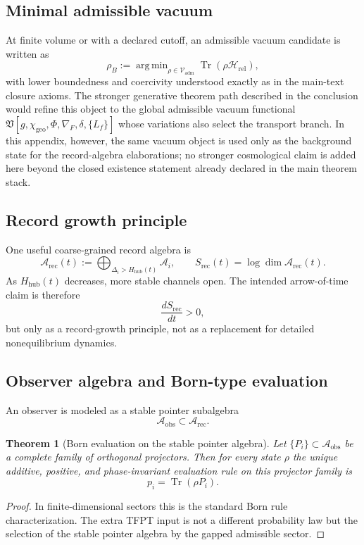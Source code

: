 \documentclass[11pt,a4paper]{article}
\newtheorem{theorem}{Theorem}[section]
\theoremstyle{definition}
\theoremstyle{remark}
\DeclareMathOperator{\tr}{Tr}
\DeclareMathOperator{\argmin}{arg\,min}
\newcommand{\Arec}{\mathcal A_{\mathrm{rec}}}
\newcommand{\Aobs}{\mathcal A_{\mathrm{obs}}}
\newcommand{\Vadm}{\mathcal V_{\mathrm{adm}}}
\newcommand{\Hrel}{\mathcal H_{\mathrm{rel}}}
\newcommand{\Hhub}{H_{\mathrm{hub}}}
\newcommand{\chigeo}{\chi_{\mathrm{geo}}}
\begin{document}
\subsection{Minimal admissible vacuum}

At finite volume or with a declared cutoff, an admissible vacuum candidate is written as
\[
\rho_B
:=
\argmin_{\rho\in\Vadm}\tr(\rho\Hrel),
\]
with lower boundedness and coercivity understood exactly as in the main-text closure axioms. The stronger generative theorem path described in the conclusion would refine this object to the global admissible vacuum functional $\mathfrak V[g,\chigeo,\Phi,\nabla_F,\delta,\{L_f\}]$ whose variations also select the transport branch. In this appendix, however, the same vacuum object is used only as the background state for the record-algebra elaborations; no stronger cosmological claim is added here beyond the closed existence statement already declared in the main theorem stack.

\subsection{Record growth principle}

One useful coarse-grained record algebra is
\[
\Arec(t):=\bigoplus_{\Delta_i>\Hhub(t)}\mathcal A_i,
\qquad
S_{\mathrm{rec}}(t)=\log\dim\Arec(t).
\]
As $\Hhub(t)$ decreases, more stable channels open. The intended arrow-of-time claim is therefore
\[
\frac{dS_{\mathrm{rec}}}{dt}>0,
\]
but only as a record-growth principle, not as a replacement for detailed nonequilibrium dynamics.

\subsection{Observer algebra and Born-type evaluation}

An observer is modeled as a stable pointer subalgebra
\[
\Aobs\subset\Arec.
\]

\begin{theorem}[Born evaluation on the stable pointer algebra]
\label{thm:born-pointer-algebra}
Let $\{P_i\}\subset \Aobs$ be a complete family of orthogonal projectors. Then for every state
$\rho$ the unique additive, positive, and phase-invariant evaluation rule on this projector family is
\[
p_i=\tr(\rho P_i).
\]
\end{theorem}

\begin{proof}
In finite-dimensional sectors this is the standard Born rule characterization. The extra TFPT input
is not a different probability law but the selection of the stable pointer algebra by the gapped
admissible sector.
\end{proof}
\end{document}
